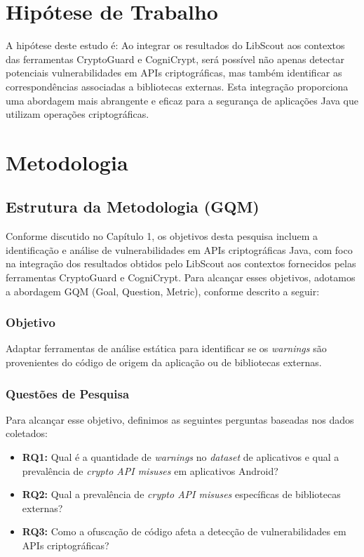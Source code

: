\section{Hipótese de Trabalho}

A hipótese deste estudo é: Ao integrar os resultados do LibScout aos contextos das ferramentas CryptoGuard e CogniCrypt, será possível não apenas detectar potenciais vulnerabilidades em APIs criptográficas, mas também identificar as correspondências associadas a bibliotecas externas. Esta integração proporciona uma abordagem mais abrangente e eficaz para a segurança de aplicações Java que utilizam operações criptográficas.

\section{Metodologia}

\subsection{Estrutura da Metodologia (GQM)}

Conforme discutido no Capítulo 1, os objetivos desta pesquisa incluem a identificação e análise de vulnerabilidades em APIs criptográficas Java, com foco na integração dos resultados obtidos pelo LibScout aos contextos fornecidos pelas ferramentas CryptoGuard e CogniCrypt. Para alcançar esses objetivos, adotamos a abordagem GQM (Goal, Question, Metric), conforme descrito a seguir:

\subsubsection{Objetivo}
Adaptar ferramentas de análise estática para identificar se os \textit{warnings} são provenientes do código de origem da aplicação ou de bibliotecas externas.

\subsubsection{Questões de Pesquisa}
Para alcançar esse objetivo, definimos as seguintes perguntas baseadas nos dados coletados:

\begin{itemize}
\item \textbf{RQ1:} Qual é a quantidade de \textit{warnings} no \textit{dataset} de aplicativos e qual a prevalência de \textit{crypto API misuses} em aplicativos Android?

\item \textbf{RQ2:} Qual a prevalência de \textit{crypto API misuses} específicas de bibliotecas externas?

\item \textbf{RQ3:} Como a ofuscação de código afeta a detecção de vulnerabilidades em APIs criptográficas?

\end{itemize}

